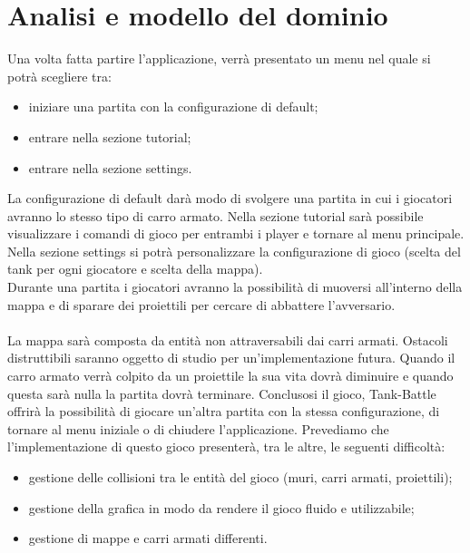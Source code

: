 \documentclass[a4paper,12pt]{report}
\begin{document}
\section{Analisi e modello del dominio}
Una volta fatta partire l’applicazione, verrà presentato un menu nel quale si potrà scegliere tra:
\begin{itemize}
	\item iniziare una partita con la configurazione di default;
	\item entrare nella sezione tutorial;
	\item entrare nella sezione settings.
\end{itemize}
La configurazione di default darà modo di svolgere una partita in cui i giocatori avranno lo stesso tipo di carro armato. Nella sezione tutorial sarà possibile visualizzare i comandi di gioco per entrambi i player e tornare al menu principale.
Nella sezione settings si potrà personalizzare la configurazione di gioco (scelta del tank per ogni giocatore e scelta della mappa).\\
Durante una partita i giocatori avranno la possibilità di muoversi all’interno della mappa e di sparare dei proiettili per cercare di abbattere l’avversario.
\paragraph{} La mappa sarà composta da entità non attraversabili dai carri armati.
Ostacoli distruttibili saranno oggetto di studio per un’implementazione futura.
Quando il carro armato verrà colpito da un proiettile la sua vita dovrà diminuire e quando questa sarà nulla la partita dovrà terminare.
Conclusosi il gioco, Tank-Battle offrirà la possibilità di giocare un’altra partita con la stessa configurazione, di tornare al menu iniziale o di chiudere l’applicazione.
Prevediamo che l’implementazione di questo gioco presenterà, tra le altre, le seguenti difficoltà:
\begin{itemize}
	\item gestione delle collisioni tra le entità del gioco (muri, carri armati, proiettili);
	\item gestione della grafica in modo da rendere il gioco fluido e utilizzabile;
	\item gestione di mappe e carri armati differenti.
\end{itemize}
\end{document}
